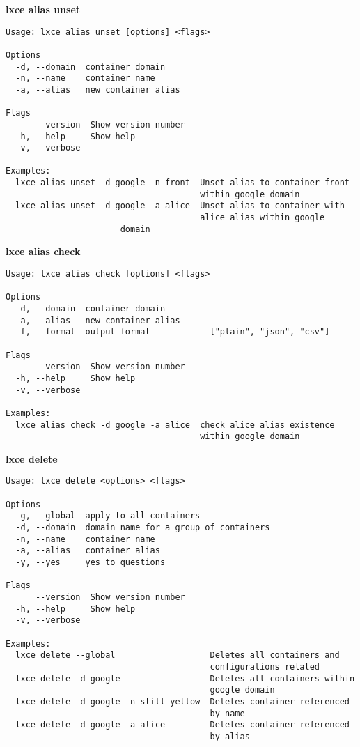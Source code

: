 \newpage
\textbf{lxce alias unset}
\begin{verbatim}
Usage: lxce alias unset [options] <flags>

Options
  -d, --domain  container domain                             
  -n, --name    container name                               
  -a, --alias   new container alias                          

Flags
      --version  Show version number                        
  -h, --help     Show help                                  
  -v, --verbose

Examples:
  lxce alias unset -d google -n front  Unset alias to container front 
                                       within google domain
  lxce alias unset -d google -a alice  Unset alias to container with 
                                       alice alias within google 
				       domain
\end{verbatim}

\textbf{lxce alias check}
\begin{verbatim}
Usage: lxce alias check [options] <flags>

Options
  -d, --domain  container domain                             
  -a, --alias   new container alias                          
  -f, --format  output format            ["plain", "json", "csv"]

Flags
      --version  Show version number                                   
  -h, --help     Show help                                             
  -v, --verbose

Examples:
  lxce alias check -d google -a alice  check alice alias existence 
                                       within google domain
\end{verbatim}


\textbf{lxce delete}
\begin{verbatim}
Usage: lxce delete <options> <flags>

Options
  -g, --global  apply to all containers                         
  -d, --domain  domain name for a group of containers            
  -n, --name    container name                                   
  -a, --alias   container alias                                 
  -y, --yes     yes to questions                                

Flags
      --version  Show version number                            
  -h, --help     Show help                                      
  -v, --verbose

Examples:
  lxce delete --global                   Deletes all containers and
                                         configurations related
  lxce delete -d google                  Deletes all containers within 
                                         google domain
  lxce delete -d google -n still-yellow  Deletes container referenced 
                                         by name
  lxce delete -d google -a alice         Deletes container referenced
                                         by alias
\end{verbatim}

